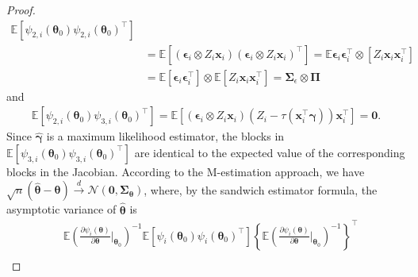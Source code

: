 \documentclass[12pt, A4]{article}
\newcommand{\ObsCov}{\textbf{x}_i}
\newcommand{\LogCoe}{\boldsymbol{\gamma}}
\newcommand{\IdenMat}{\textbf{I}}
\begin{document}
\begin{proof}
\begin{align*}
                \mathbb{E} [ \psi_{2,i}(\boldsymbol{\theta}_0) \psi_{2,i}(\boldsymbol{\theta}_0)^{\top} ] \\
                &= \mathbb{E} \left[  (\boldsymbol{\epsilon}_i\otimes Z_i\ObsCov) (\boldsymbol{\epsilon}_i\otimes Z_i\ObsCov)^{\top} \right]
                = \mathbb{E}  \boldsymbol{\epsilon}_i\boldsymbol{\epsilon}_i^{\top} \otimes \left[ Z_i\ObsCov\ObsCov^{\top}  \right] \\
                &=\mathbb{E}\left[\boldsymbol{\epsilon}_i\boldsymbol{\epsilon}_i^{\top} \right] \otimes \mathbb{E} \left[Z_i \ObsCov\ObsCov^{\top}\right] 
                =   \boldsymbol{\Sigma}_{\epsilon} \otimes \boldsymbol{\Pi} 
            \end{align*}
        and 
            \begin{align*}
                \mathbb{E} [ \psi_{2,i}(\boldsymbol{\theta}_0) \psi_{3,i}(\boldsymbol{\theta}_0)^{\top} ] 
                =  \mathbb{E} \left[  ( \boldsymbol{\epsilon}_i \otimes Z_i\ObsCov ) (Z_i - \tau(\ObsCov^{\top} \LogCoe))\ObsCov^{\top} \right] = \textbf{0}.
            \end{align*}
        Since $\hat{\LogCoe}$ is a maximum likelihood estimator, the blocks in $\mathbb{E} [ \psi_{3,i}(\boldsymbol{\theta}_0)\psi_{3,i}(\boldsymbol{\theta}_0)^{\top} ] $ are identical to the expected value of the corresponding blocks in the Jacobian.
        According to the M-estimation approach, we have $\sqrt{n}( \hat{\boldsymbol{\theta}} -\boldsymbol{\theta} ) \overset{d}{\rightarrow} \mathcal{N}(\textbf{0}, \boldsymbol{\Sigma_\theta})$,
        where, by the sandwich estimator formula, the asymptotic variance of $\hat{\boldsymbol{\theta}}$ is
            \begin{align*}
                &  \mathbb{E} \left( \frac{\partial \psi_i(\boldsymbol{\theta})}{ \partial \boldsymbol{\theta}} \biggr\rvert_{\boldsymbol{\theta}_0} \right)^{-1} 
                    \mathbb{E} [ \psi_i(\boldsymbol{\theta}_0)\psi_i(\boldsymbol{\theta}_0)^{\top} ]
                    \left\{ \mathbb{E} \left( \frac{\partial \psi_i(\boldsymbol{\theta})}{ \partial \boldsymbol{\theta}} \biggr\rvert_{\boldsymbol{\theta}_0} \right)^{-1} \right\}^{\top} \\

\end{align*}
\end{proof}
\end{document}
